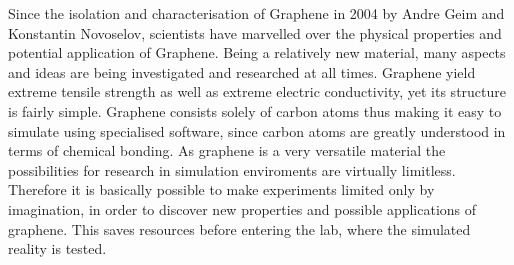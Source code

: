 
Since the isolation and characterisation of
Graphene in 2004 by Andre Geim and
Konstantin Novoselov, scientists have marvelled over the physical properties and potential
application of Graphene. Being a relatively new material, many aspects and ideas are being
investigated and researched at all times. Graphene yield extreme tensile strength as well as
extreme electric conductivity, yet its structure is fairly simple. Graphene consists solely of
carbon atoms thus making it easy to simulate using specialised software, since carbon atoms are greatly understood in terms of chemical
bonding.
As graphene is a very versatile material the possibilities for research in simulation enviroments are virtually limitless.
Therefore it is basically possible to make experiments limited only by imagination, in order
to discover new properties and possible applications of graphene. This saves resources
before entering the lab, where the simulated reality is tested.

